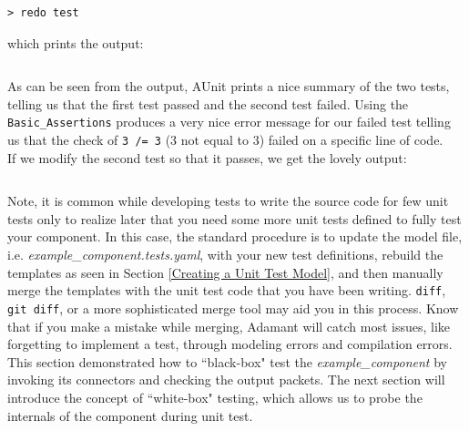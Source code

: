 \vspace{5mm} %
\begin{verbatim}
> redo test
\end{verbatim}
\vspace{5mm} %

which prints the output:

\vspace{5mm} %
\inputminted{text}{../example_architecture/example_component/test/output.txt}
\vspace{5mm} %

As can be seen from the output, AUnit prints a nice summary of the two tests, telling us that the first test passed and the second test failed. Using the \texttt{Basic\_Assertions} produces a very nice error message for our failed test telling us that the check of \texttt{3 /= 3} (3 not equal to 3) failed on a specific line of code. \\

If we modify the second test so that it passes, we get the lovely output:

\vspace{5mm} %
\inputminted{text}{../example_architecture/example_component/test2/output.txt}
\vspace{5mm} %

Note, it is common while developing tests to write the source code for few unit tests only to realize later that you need some more unit tests defined to fully test your component. In this case, the standard procedure is to update the model file, i.e. \textit{example\_component.tests.yaml}, with your new test definitions, rebuild the templates as seen in Section \ref{Creating a Unit Test Model}, and then manually merge the templates with the unit test code that you have been writing. \texttt{diff}, \texttt{git diff}, or a more sophisticated merge tool may aid you in this process. Know that if you make a mistake while merging, Adamant will catch most issues, like forgetting to implement a test, through modeling errors and compilation errors. \\

This section demonstrated how to ``black-box" test the \textit{example\_component} by invoking its connectors and checking the output packets. The next section will introduce the concept of ``white-box" testing, which allows us to probe the internals of the component during unit test.

